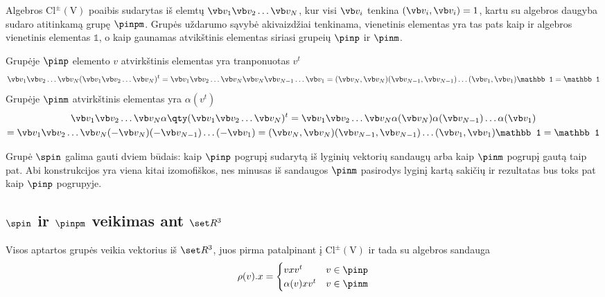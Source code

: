 

Algebros $\mathup{Cl^\pm(V)}$ poaibis sudarytas iš elemtų $\vb v_1 \vb v_2
\dots \vb v_N$, kur visi $\vb v_i$ tenkina $(\vb v_i,\vb v_i) = 1$, kartu su
algebros daugyba sudaro atitinkamą grupę $\pinpm$. Grupės uždarumo sąvybė akivaizdžiai tenkinama, 
vienetinis elementas yra tas pats kaip ir algebros vienetinis elementas $\mathbb 1$,
o kaip gaunamas atvikštinis elementas siriasi grupeių $\pinp$ ir $\pinm$.

Grupėje $\pinp$ elemento $v$ atvirkštinis elementas yra tranponuotas $v^t$
\begin{multline}
	\vb v_1 \vb v_2 \dots \vb v_N (\vb v_1 \vb v_2 \dots \vb v_N )^t
	=
	\vb v_1 \vb v_2 \dots \vb v_N \vb v_N \vb v_{N-1} \dots \vb v_1
	=
	(\vb v_N,\vb v_N)
	(\vb v_{N-1},\vb v_{N-1})
	\dots
	(\vb v_1,\vb v_1)
	\mathbb 1
	=
	\mathbb 1
\end{multline}
Grupėje $\pinm$ atvirkštinis elementas yra $\alpha(v^t)$
\begin{multline}
	\vb v_1 \vb v_2 \dots \vb v_N \alpha\qty(\vb v_1 \vb v_2 \dots \vb v_N )^t
	=
	\vb v_1 \vb v_2 \dots \vb v_N \alpha(\vb v_N) \alpha(\vb v_{N-1}) \dots \alpha(\vb v_1)
	\\=
	\vb v_1 \vb v_2 \dots \vb v_N (-\vb v_N) (-\vb v_{N-1}) \dots (-\vb v_1)
	=
	(\vb v_N,\vb v_N)
	(\vb v_{N-1},\vb v_{N-1})
	\dots
	(\vb v_1,\vb v_1)
	\mathbb 1
	=
	\mathbb 1
\end{multline}

Grupė $\spin$ galima gauti dviem būdais: kaip $\pinp$ pogrupį sudarytą
iš lyginių vektorių sandaugų arba kaip $\pinm$ pogrupį gautą taip pat.
Abi konstrukcijos yra viena kitai izomofiškos, nes minusas iš sandaugos
$\pinm$ pasirodys lyginį kartą sakičių ir rezultatas bus toks pat kaip
$\pinp$ pogrupyje.

\subsection{$\spin$ ir $\pinpm$ veikimas ant $\set R^3$}

Visos aptartos grupės veikia vektorius iš $\set R^3$, juos pirma patalpinant į
$\mathup{Cl^\pm(V)}$ ir tada su algebros sandauga
\begin{equation}
	\rho(v).x = \begin{cases}
		vxv^t		& v \in \pinp \\
		\alpha(v)xv^t	& v \in \pinm 
	\end{cases}
\end{equation}



